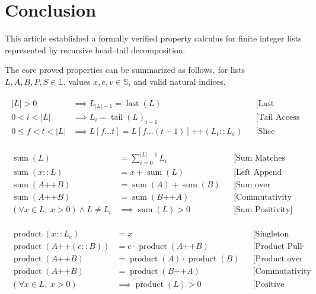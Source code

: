 \section{Conclusion}
\label{sec:conclusion}

This article established a formally verified property calculus for
finite integer lists represented by recursive head--tail decomposition.

The core proved properties can be summarized as follows, for lists
$L,A,B,P,S \in \mathbb{L}$, values $x,e,v \in \mathbb{S}$, and valid
natural indices.

\begin{gather*}
\begin{aligned}
|L| > 0
&\implies L_{|L|-1} = \operatorname{last}(L)
&&\text{[Last Element Identity]} \\
0 < i < |L|
&\implies L_i = \operatorname{tail}(L)_{i-1}
&&\text{[Tail Access Shift]} \\
0 \leq f < t < |L|
&\implies L[f \dots t]
 = L[f \dots (t - 1)] \mathbin{\texttt{++}} (L_t :: L_e)
&&\text{[Slice Append Consistency]}
\end{aligned}
\end{gather*}

\begin{gather*}
\begin{aligned}
\operatorname{sum}(L)
&= \sum_{i=0}^{|L|-1} L_i
&&\text{[Sum Matches Summation]} \\
\operatorname{sum}(x :: L)
&= x + \operatorname{sum}(L)
&&\text{[Left Append Preserves Sum]} \\
\operatorname{sum}(A \mathbin{\texttt{++}} B)
&= \operatorname{sum}(A) + \operatorname{sum}(B)
&&\text{[Sum over Concatenation]} \\
\operatorname{sum}(A \mathbin{\texttt{++}} B)
&= \operatorname{sum}(B \mathbin{\texttt{++}} A)
&&\text{[Commutativity of Sum]} \\
(\forall x \in L,\ x > 0) \land L \neq L_e
&\implies \operatorname{sum}(L) > 0
&&\text{[Sum Positivity]}
\end{aligned}
\end{gather*}

\begin{gather*}
\begin{aligned}
\operatorname{product}(x :: L_e)
&= x
&&\text{[Singleton Product]} \\
\operatorname{product}(A \mathbin{\texttt{++}} (e :: B))
&= e \cdot \operatorname{product}(A \mathbin{\texttt{++}} B)
&&\text{[Product Pull-Out Element]} \\
\operatorname{product}(A \mathbin{\texttt{++}} B)
&= \operatorname{product}(A) \cdot \operatorname{product}(B)
&&\text{[Product over Concatenation]} \\
\operatorname{product}(A \mathbin{\texttt{++}} B)
&= \operatorname{product}(B \mathbin{\texttt{++}} A)
&&\text{[Commutativity of Product]} \\
(\forall x \in L,\ x > 0)
&\implies \operatorname{product}(L) > 0
&&\text{[Positive Product]}
\end{aligned}
\end{gather*}

